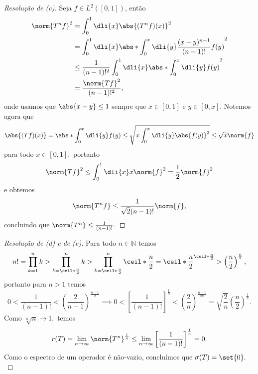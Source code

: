 \begin{proof}[Resolução de (c)]
  Seja \(f \in L^2([0,1])\), então
  \begin{align*}
    \norm{T^nf}^2 &= \int_0^1 \dli{x} \abs{(T^nf)(x)}^2\\
                  &= \int_0^1 \dli{x} \abs*{\int_0^x \dli{y} \frac{(x - y)^{n-1}}{(n-1)!} f(y)}^2\\
                  &\leq \frac{1}{(n-1)!^2}\int_0^1 \dli{x} \abs*{\int_0^x \dli{y}f(y)}^2\\
                  &= \frac{\norm{Tf}^2}{(n - 1)!^2},
  \end{align*}
  onde usamos que \(\abs{x - y} \leq 1\) sempre que \(x \in [0,1]\) e \(y \in [0,x]\). Notemos agora que
  \begin{equation*}
    \abs{(Tf)(x)} = \abs*{\int_0^x \dli{y} f(y)} \leq \sqrt{x\int_0^x \dli{y} \abs{f(y)}^2} \leq \sqrt{x} \norm{f}
  \end{equation*}
  para todo \(x \in [0,1],\) portanto
  \begin{equation*}
    \norm{Tf}^2 \leq \int_0^1 \dli{x} x \norm{f}^2 = \frac{1}{2} \norm{f}^2
  \end{equation*}
  e obtemos
  \begin{equation*}
    \norm{T^nf} \leq \frac{1}{\sqrt{2} (n - 1)!} \norm{f},
  \end{equation*}
  concluindo que \(\norm{T^n} \leq \frac{1}{(n-1)!}.\)
\end{proof}
\begin{proof}[Resolução de (d) e de (e)]
    Para todo \(n \in \mathbb{N}\) temos
    \begin{equation*}
      n! = \prod_{k = 1}^n k > \prod_{k = \ceil*{\frac{n}{2}}}^n k > \prod_{k = \ceil*{\frac{n}{2}}}^n \ceil*{\frac{n}{2}} = \ceil*{\frac{n}{2}}^{\ceil*{\frac{n}{2}}} > \left(\frac{n}{2}\right)^{\frac{n}{2}},
    \end{equation*}
    portanto para \(n > 1\) temos
    \begin{equation*}
      0 < \frac{1}{(n-1)!} < \left(\frac{2}{n-1}\right)^{\frac{n-1}{2}} \implies 0 < \left[\frac{1}{(n-1)!}\right]^{\frac{1}{n}} < \left(\frac{2}{n}\right)^{\frac{n-1}{2n}} = \sqrt{\frac2n} \left(\frac{n}{2}\right)^{\frac{1}{n}}.
    \end{equation*}
    Como \(\sqrt[n]{n} \to 1,\) temos
    \begin{equation*}
      r(T) = \lim_{n\to\infty}\norm{T^n}^{\frac1n} \leq \lim_{n\to\infty}\left[\frac{1}{(n-1)!}\right]^{\frac1n} = 0.
    \end{equation*}
    Como o espectro de um operador é não-vazio, concluímos que \(\sigma(T) = \set{0}.\)
\end{proof}
